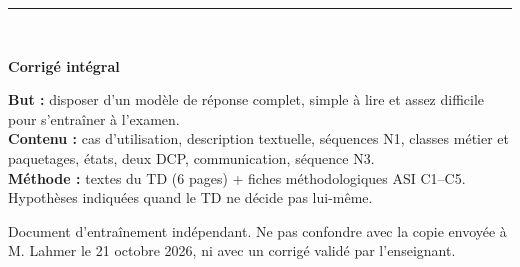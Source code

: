 \documentclass[10pt,a4paper]{article}
\begin{document}
\thispagestyle{empty}
\vspace*{22mm}
{\color{teal}\rule{35mm}{3pt}}\\[12mm]
{\Huge\bfseries Corrigé intégral\par}
\vspace{4mm}{\LARGE Organisation de courses de fond\par}
\vspace{4mm}{\large Les 9 questions du TD final + diagrammes détaillés\par}
\vspace{14mm}
\begin{tcolorbox}[colback=pale]
\textbf{But :} disposer d'un modèle de réponse complet, simple à lire et assez difficile pour s'entraîner à l'examen.\\
\textbf{Contenu :} cas d'utilisation, description textuelle, séquences N1, classes métier et paquetages, états, deux DCP, communication, séquence N3.\\
\textbf{Méthode :} textes du TD (6 pages) + fiches méthodologiques ASI C1--C5. Hypothèses indiquées quand le TD ne décide pas lui-même.\end{tcolorbox}
\vfill
{\small\color{bodygray} Document d'entraînement indépendant. Ne pas confondre avec la copie envoyée à M. Lahmer le 21 octobre 2026, ni avec un corrigé validé par l'enseignant.}
\newpage
\tableofcontents
\newpage
\end{document}
